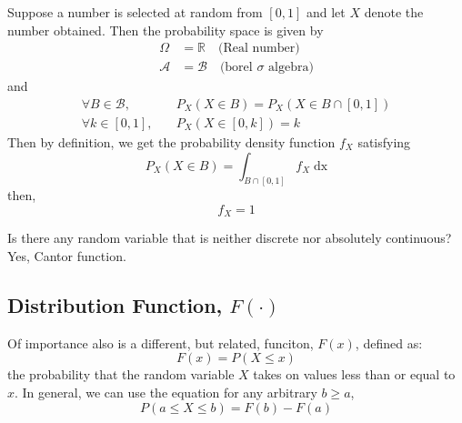 \documentclass[twoside]{article}
\makeatletter
\theoremstyle{definition}
\theoremstyle{remark}
\theoremstyle{remark}
\newenvironment{example}
 {\patchcmd{\@thm}{\trivlist}{\list{}{\leftmargin=3em \rightmargin=3em}}{}{}%
  \vspace*{10\p@}
  \innerexample\pushQED{\hfill\ensuremath{\Diamond}}}
 {\popQED\endinnerexample}
\makeatother
\begin{document}
\begin{example}
  Suppose a number is selected at random from $[0, 1]$ and let $X$ denote the
  number obtained. Then the probability space is given by
  \begin{equation*}
    \begin{split}
      \Omega &= \mathbb{R} \quad \textrm{(Real number)} \\
      \mathcal{A} &= \mathcal{B} \quad \textrm{(borel $\sigma$ algebra)}
    \end{split}
  \end{equation*}
  and
  \begin{equation*}
    \begin{array}{ll}
      \forall B \in \mathcal{B}, &\quad P_X(X \in B) = P_X(X \in B \cap [0, 1]) \\
      \forall k \in [0, 1],      &\quad P_X(X \in [0, k]) = k
    \end{array}
  \end{equation*}
  Then by definition, we get the probability density function $f_X$ satisfying
  \begin{equation*}
    P_X(X \in B) = \int_{B \cap [0, 1]} f_X \; \mathrm{dx}
  \end{equation*}
  then,
  \begin{equation*}
    f_X = 1
  \end{equation*}

\end{example}

\begin{example}
  Is there any random variable that is neither discrete nor absolutely continuous? \\
  Yes, Cantor function.
\end{example}

\subsection{Distribution Function, $F(\cdot)$}
Of importance also is a different, but related, funciton, $F(x)$, defined as:
\begin{equation}
  F(x) = P(X \leq x)
\end{equation}
the probability that the random variable $X$ takes on values less than or equal
to $x$. In general, we can use the equation for any arbitrary $b \geq a$,
\begin{equation}
  P(a \leq X \leq b) = F(b) - F(a)
\end{equation}
\end{document}
